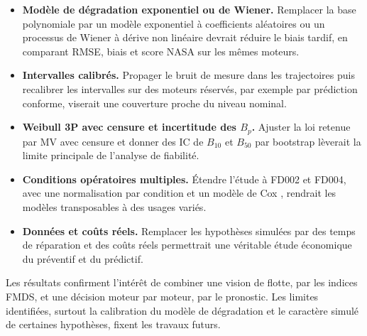 \begin{itemize}
\item \textbf{Modèle de dégradation exponentiel ou de Wiener.} Remplacer la base polynomiale par un modèle exponentiel à coefficients aléatoires ou un processus de Wiener à dérive non linéaire \cite{gebraeel2005,si2012} devrait réduire le biais tardif, en comparant RMSE, biais et score NASA sur les mêmes moteurs.
\item \textbf{Intervalles calibrés.} Propager le bruit de mesure dans les trajectoires puis recalibrer les intervalles sur des moteurs réservés, par exemple par prédiction conforme, viserait une couverture proche du niveau nominal.
\item \textbf{Weibull 3P avec censure et incertitude des $B_p$.} Ajuster la loi retenue par MV avec censure et donner des IC de $B_{10}$ et $B_{50}$ par bootstrap \cite{efron1979} lèverait la limite principale de l'analyse de fiabilité.
\item \textbf{Conditions opératoires multiples.} Étendre l'étude à FD002 et FD004, avec une normalisation par condition et un modèle de Cox \cite{cox1972}, rendrait les modèles transposables à des usages variés.
\item \textbf{Données et coûts réels.} Remplacer les hypothèses simulées par des temps de réparation et des coûts réels permettrait une véritable étude économique du préventif et du prédictif.
\end{itemize}

\chapconclusion

Les résultats confirment l'intérêt de combiner une vision de flotte, par les indices FMDS, et une décision moteur par moteur, par le pronostic. Les limites identifiées, surtout la calibration du modèle de dégradation et le caractère simulé de certaines hypothèses, fixent les travaux futurs.
